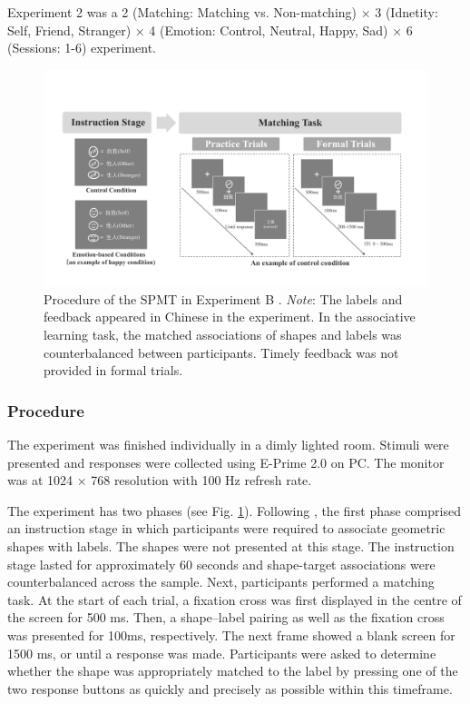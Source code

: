 \documentclass[sn-apa]{sn-jnl}%
\theoremstyle{thmstyleone}%
\theoremstyle{thmstyletwo}%
\theoremstyle{thmstylethree}%
\begin{document}
Experiment 2 was a 2 (Matching: Matching vs. Non-matching) × 3 (Idnetity: Self, Friend, Stranger) × 4 (Emotion: Control, Neutral, Happy, Sad) × 6 (Sessions: 1-6) experiment. 

\renewcommand{\thefigure}{S\arabic{figure}} %

\begin{figure}[!ht]
	\centering
	\includegraphics[width=1\textwidth]{./Figure/Fig1_Hu_pro.pdf}
	\caption[Procedure of the SPMT in Experiment B \parencite{hu2023data}]{	Procedure of the SPMT in Experiment B \parencite{hu2023data}. \textit{Note}: The labels and feedback appeared in Chinese in the experiment. In the associative learning task, the matched associations of shapes and labels was counterbalanced between participants. Timely feedback was not provided in formal trials.}
	\label{fig:Hu_SPMT_procedure}
\end{figure}

\subsubsection{Procedure}\label{subsec:procedure}

The experiment was finished individually in a dimly lighted room. Stimuli were presented and responses were collected using E-Prime 2.0 on PC. The monitor was at 1024 × 768 resolution with 100 Hz refresh rate.

The experiment has two phases (see Fig.  \ref{fig:Hu_SPMT_procedure}). Following \textcite{sui2012perceptual}, the first phase comprised an instruction stage in which participants were required to associate geometric shapes with labels. The shapes were not presented at this stage. The instruction stage lasted for approximately 60 seconds and shape-target associations were counterbalanced across the sample. Next, participants performed a matching task. At the start of each trial, a fixation cross was first displayed in the centre of the screen for 500 ms. Then, a shape–label pairing as well as the fixation cross was presented for 100ms, respectively. The next frame showed a blank screen for 1500 ms, or until a response was made. Participants were asked to determine whether the shape was appropriately matched to the label by pressing one of the two response buttons as quickly and precisely as possible within this timeframe. 
\end{document}

